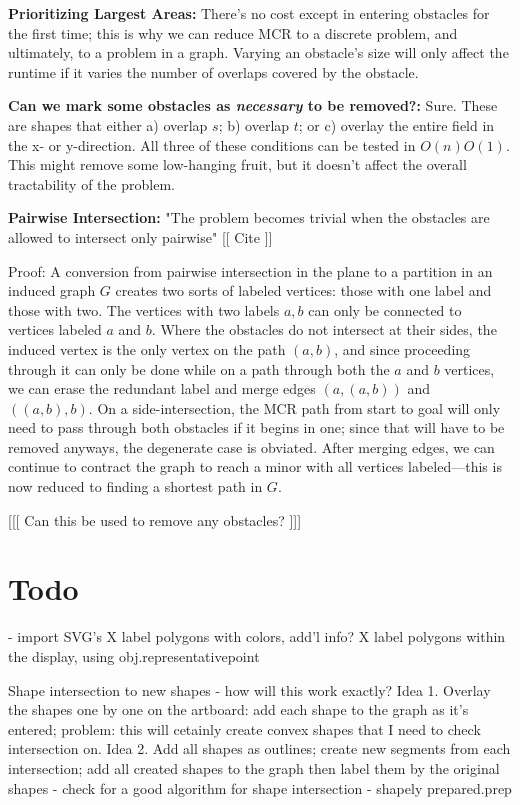 \documentclass{amsart}
\begin{document}
{\textbf{Prioritizing Largest Areas:} There's no cost except in entering obstacles for the first time; this is why we can reduce MCR to a discrete problem, and ultimately, to a problem in a graph. Varying an obstacle's size will only affect the runtime if it varies the number of overlaps covered by the obstacle.

\textbf{Can we mark some obstacles as \emph{necessary} to be removed?:} Sure. These are shapes that either a) overlap $s$; b) overlap $t$; or c) overlay the entire field in the x- or y-direction. All three of these conditions can be tested in $O(n) O(1)$. This might remove some low-hanging fruit, but it doesn't affect the overall tractability of the problem.

\textbf{Pairwise Intersection:} "The problem becomes trivial when the obstacles are allowed to intersect only pairwise" [[ Cite ]]

Proof: A conversion from pairwise intersection in the plane to a partition in an induced graph $G$ creates two sorts of labeled vertices: those with one label and those with two. The vertices with two labels $a, b$ can only be connected to vertices labeled $a$ and $b$. Where the obstacles do not intersect at their sides, the induced vertex is the only vertex on the path $(a, b)$, and since proceeding through it can only be done while on a path through both the $a$ and $b$ vertices, we can erase the redundant label and merge edges $(a, (a, b))$ and $((a, b), b)$. On a side-intersection, the MCR path from start to goal will only need to pass through both obstacles if it begins in one; since that will have to be removed anyways, the degenerate case is obviated. After merging edges, we can continue to contract the graph to reach a minor with all vertices labeled---this is now reduced to finding a shortest path in $G$.


[[[ Can this be used to remove any obstacles? ]]]

\section{Todo}

- import SVG's
X label polygons with colors, add'l info?
X label polygons within the display, using obj.representativepoint

Shape intersection to new shapes
    - how will this work exactly?
    Idea 1. Overlay the shapes one by one on the artboard: add each shape to the graph as it's entered; problem: this will cetainly create convex shapes that I need to check intersection on.
    Idea 2. Add all shapes as outlines; create new segments from each intersection; add all created shapes to the graph then label them by the original shapes
    - check for a good algorithm for shape intersection
    - shapely prepared.prep
    
}
\end{document}
